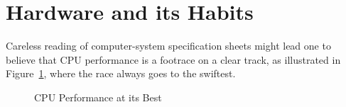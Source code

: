 
\section{Hardware and its Habits}
\label{sec:intro:Hardware and its Habits}

Careless reading of computer-system specification sheets might lead one
to believe that CPU performance is a footrace on a clear track, as
illustrated in Figure~\ref{fig:intro:CPU Performance at its Best},
where the race always goes to the swiftest.

\begin{figure}[htb]
\begin{center}
\end{center}
\caption{CPU Performance at its Best}
\label{fig:intro:CPU Performance at its Best}
\end{figure}

